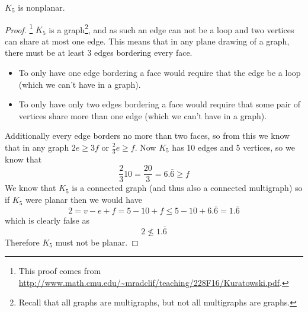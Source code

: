 \documentclass{article}
\begin{document}
\begin{theorem} \label{k5}
	$K_5$ is nonplanar.
\end{theorem}
\begin{center}

	\scalebox{.9}{$K_5$}
\end{center}
\begin{proof}\footnote{This proof comes from \url{http://www.math.cmu.edu/~mradclif/teaching/228F16/Kuratowski.pdf}.}
	$K_5$ is a graph\footnote{Recall that all graphs are multigraphs, but not all multigraphs are graphs.}, and as such an edge can not be a loop and two vertices can share at most one edge. This means that in any plane drawing of a graph, there must be at least 3 edges bordering every face.
	\begin{itemize}
		\item To only have one edge bordering a face would require that the edge be a loop (which we can't have in a graph).
		\item To only have only two edges bordering a face would require that some pair of vertices share more than one edge (which we can't have in a graph).
	\end{itemize}
	Additionally every edge borders no more than two faces, so from this we know that in any graph $2e \ge 3f$ or $\frac23e\ge f$. Now $K_5$ has 10 edges and 5 vertices, so we know that $$\frac2310=\frac{20}3=6.\bar6\ge f$$ We know that $K_5$ is a connected graph (and thus also a connected multigraph) so if $K_5$ were planar then we would have $$2=v-e+f=5-10+f\le5-10+6.\bar6 = 1.\bar6$$ which is clearly false as $$2\not\le1.\bar6$$ Therefore $K_5$ must not be planar.
\end{proof}
\end{document}
